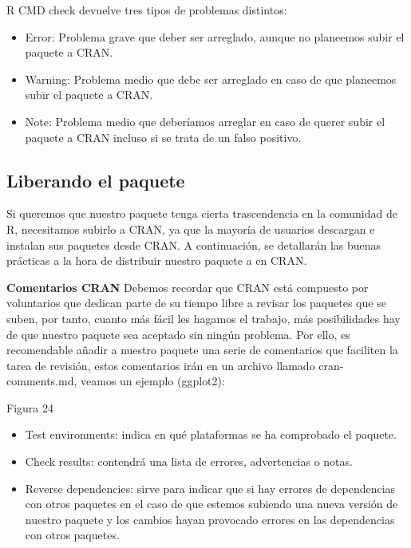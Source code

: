 R CMD check devuelve tres tipos de problemas distintos:

\begin{itemize}
    \item Error: Problema grave que deber ser arreglado, aunque no planeemos subir el
paquete a CRAN.
    \item Warning: Problema medio que debe ser arreglado en caso de que planeemos subir
el paquete a CRAN.
    \item Note: Problema medio que deber\'iamos arreglar en caso de querer subir el paquete a
CRAN incluso si se trata de un falso positivo.
\end{itemize}


\subsection{Liberando el paquete}

Si queremos que nuestro paquete tenga cierta trascendencia en la comunidad de R,
necesitamos subirlo a CRAN, ya que la mayor\'ia de usuarios descargan e instalan sus
paquetes desde CRAN.
A continuaci\'on, se detallar\'an las buenas pr\'acticas a la hora de distribuir nuestro paquete a
en CRAN.


\textbf{Comentarios CRAN}
Debemos recordar que CRAN est\'a compuesto por voluntarios que dedican parte de su tiempo
libre a revisar los paquetes que se suben, por tanto, cuanto m\'as f\'acil les hagamos el trabajo,
m\'as posibilidades hay de que nuestro paquete sea aceptado sin ning\'un problema.
Por ello, es recomendable a\~nadir a nuestro paquete una serie de comentarios que faciliten la
tarea de revisi\'on, estos comentarios ir\'an en un archivo llamado cran-comments.md, veamos
un ejemplo (ggplot2):

Figura 24

\begin{itemize}

    \item Test environments: indica en qu\'e plataformas se ha comprobado el paquete.
    \item Check results: contendr\'a una lista de errores, advertencias o notas.
    \item Reverse dependencies: sirve para indicar que si hay errores de dependencias con
otros paquetes en el caso de que estemos subiendo una nueva versi\'on de nuestro
paquete y los cambios hayan provocado errores en las dependencias con otros
paquetes.
\end{itemize}

